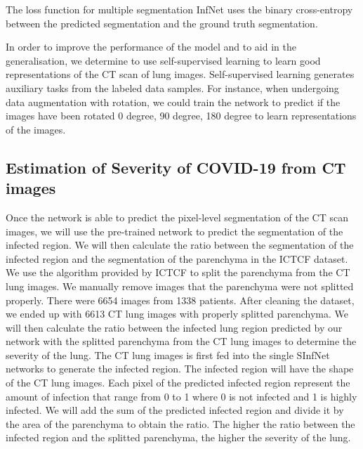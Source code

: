 The loss function for multiple segmentation InfNet uses the binary cross-entropy between the predicted segmentation and the ground truth segmentation.

In order to improve the performance of the model and to aid in the generalisation, we  determine to use self-supervised learning to learn good representations of the CT scan of lung images. Self-supervised learning generates auxiliary tasks from the labeled data samples. For instance, when undergoing data augmentation with rotation, we could train the network to predict if the images have been rotated 0 degree, 90 degree, 180 degree to learn representations of the images. 


\subsection{Estimation of Severity of COVID-19 from CT images}
Once the network is able to predict the pixel-level segmentation of the CT scan images, we will use the pre-trained network to predict the segmentation of the infected region. We will then calculate the ratio between the segmentation of the infected region and the segmentation of the parenchyma in the ICTCF dataset. We use the algorithm provided by ICTCF to split the parenchyma from the CT lung images. We manually remove images that the parenchyma were not splitted properly. There were 6654 images from 1338 patients. After cleaning the dataset, we ended up with 6613 CT lung images with properly splitted parenchyma. We will then calculate the ratio between the infected lung region predicted by our network with the splitted parenchyma from the CT lung images to determine the severity of the lung. The CT lung images is first fed into the single SInfNet networks to generate the infected region. The infected region will have the shape of the CT lung images. Each pixel of the predicted infected region represent the amount of infection that range from 0 to 1 where 0 is not infected and 1 is highly infected. We will add the sum of the predicted infected region and divide it by the area of the parenchyma to obtain the ratio. The higher the ratio between the infected region and the splitted parenchyma, the higher the severity of the lung.


